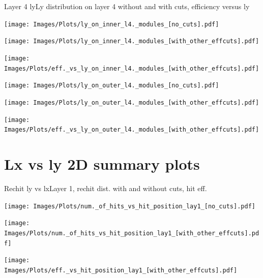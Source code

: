 \documentclass{beamer}
\begin{document}
\begin{frame}{Layer 4 ly}{Ly distribution on layer 4 without and with cuts, efficiency versus ly}
\begin{minipage}{0.32\textwidth}
  \centering
  \texttt{[image: Images/Plots/ly\_on\_inner\_l4.\_modules\_[no\_cuts].pdf]}
\end{minipage}%
\hspace{0.01\textwidth}%
\begin{minipage}{0.32\textwidth}
  \centering
  \texttt{[image: Images/Plots/ly\_on\_inner\_l4.\_modules\_[with\_other\_effcuts].pdf]}
\end{minipage}%
\hspace{0.01\textwidth}%
\begin{minipage}{0.32\textwidth}
  \centering
  \texttt{[image: Images/Plots/eff.\_vs\_ly\_on\_inner\_l4.\_modules\_[with\_other\_effcuts].pdf]}
\end{minipage}
\begin{minipage}{0.32\textwidth}
  \centering
  \texttt{[image: Images/Plots/ly\_on\_outer\_l4.\_modules\_[no\_cuts].pdf]}
\end{minipage}%
\hspace{0.01\textwidth}%
\begin{minipage}{0.32\textwidth}
  \centering
  \texttt{[image: Images/Plots/ly\_on\_outer\_l4.\_modules\_[with\_other\_effcuts].pdf]}
\end{minipage}%
\hspace{0.01\textwidth}%
\begin{minipage}{0.32\textwidth}
  \centering
  \texttt{[image: Images/Plots/eff.\_vs\_ly\_on\_outer\_l4.\_modules\_[with\_other\_effcuts].pdf]}
\end{minipage}
\end{frame}

\section{Lx vs ly 2D summary plots}

\begin{frame}{Rechit ly vs lx}{Layer 1, rechit dist. with and without cuts, hit eff.}
  \begin{minipage}{0.32\textwidth}
    \centering
    \texttt{[image: Images/Plots/num.\_of\_hits\_vs\_hit\_position\_lay1\_[no\_cuts].pdf]}
  \end{minipage}%
  \begin{minipage}{0.32\textwidth}
    \centering
    \texttt{[image: Images/Plots/num.\_of\_hits\_vs\_hit\_position\_lay1\_[with\_other\_effcuts].pdf]}
  \end{minipage}%
  \begin{minipage}{0.32\textwidth}
    \centering
    \texttt{[image: Images/Plots/eff.\_vs\_hit\_position\_lay1\_[with\_other\_effcuts].pdf]}
  \end{minipage}
\end{frame}
\end{document}
